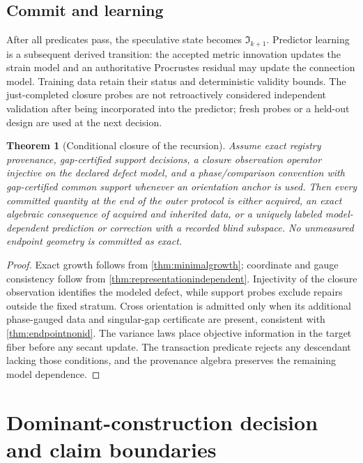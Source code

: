 \documentclass[10pt,twocolumn]{article}
\newcommand{\cref}[1]{\autoref{#1}}
\newtheorem{theorem}{Theorem}[section]
\theoremstyle{definition}
\theoremstyle{remark}
\begin{document}
\subsection{Commit and learning}

After all predicates pass, the speculative state becomes
$\mathfrak I_{k+1}$.  Predictor learning is a subsequent derived transition:
the accepted metric innovation updates the strain model and an authoritative
Procrustes residual may update the connection model.  Training data retain
their status and deterministic validity bounds.  The just-completed closure probes are not
retroactively considered independent validation after being incorporated
into the predictor; fresh probes or a held-out design are used at the next
decision.

\begin{theorem}[Conditional closure of the recursion]
\label{thm:protocolclosure}
Assume exact registry provenance, gap-certified support decisions, a closure
observation operator injective on the declared defect model, and a
phase/comparison convention with gap-certified common support whenever an
orientation anchor is used.  Then every committed quantity at the end of the
outer protocol is either acquired, an exact algebraic consequence of acquired
and inherited data, or a uniquely labeled model-dependent prediction or
correction with a recorded blind subspace.  No unmeasured endpoint geometry is
committed as exact.
\end{theorem}
\begin{proof}
Exact growth follows from \cref{thm:minimalgrowth}; coordinate and gauge
consistency follow from \cref{thm:representationindependent}.  Injectivity of
the closure observation identifies the modeled defect, while support probes
exclude repairs outside the fixed stratum.  Cross orientation is admitted
only when its additional phase-gauged data and singular-gap certificate are
present, consistent with \cref{thm:endpointnonid}.  The variance laws place
objective information in the target fiber before any secant update.  The
transaction predicate rejects any descendant lacking those conditions, and
the provenance algebra preserves the remaining model dependence.
\end{proof}

\section{Dominant-construction decision and claim boundaries}
\label{app:decision}
\end{document}
